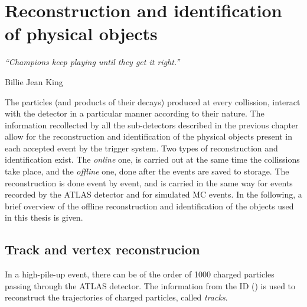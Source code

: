 \chapter{Reconstruction and identification of physical objects}
\label{ch:objects}
\epigraph{\emph{“Champions keep playing until they get it right.”}}{Billie Jean King}


The particles (and products of their decays) produced at every collission, interact with the detector in a particular manner according to their nature. The information recollected by all the sub-detectors described in the previous chapter allow for the reconstruction and identification of the physical objects present in each accepted event by the trigger system. Two types of reconstruction and identification exist. The \textit{online} one, is carried out at the same time the \pp collissions take place, and the \textit{offline} one, done after the events are saved to storage. The reconstruction is done event by event, and is carried in the same way for events recorded by the \ac{ATLAS} detector and for simulated \ac{MC} events. In the following, a brief overview of the offline reconstruction and identification of the objects used in this thesis is given.







\section{Track and vertex reconstrucion}

In a high-pile-up event, there can be of the order of 1000 charged particles passing through the \ac{ATLAS} detector. The information from the \ac{ID} (\Sect{\ref{subsec:atlas:atlas:id}}) is used to reconstruct the trajectories of charged particles, called \textit{tracks}.

